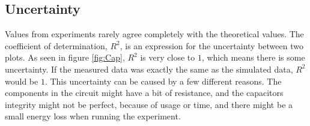 \subsection{Uncertainty}
Values from experiments rarely agree completely with the theoretical values. The coefficient of determination, $R^2$, is an expression for the uncertainty between two plots. As seen in figure \ref{fig:Cap}, $R^2$ is very close to $1$, which means there is some uncertainty. If the measured data was exactly the same as the simulated data, $R^2$ would be $1$. This uncertainty can be caused by a few different reasons. The components in the circuit might have a bit of resistance, and the capacitors integrity might not be perfect, because of usage or time, and there might be a small energy loss when running the experiment. 